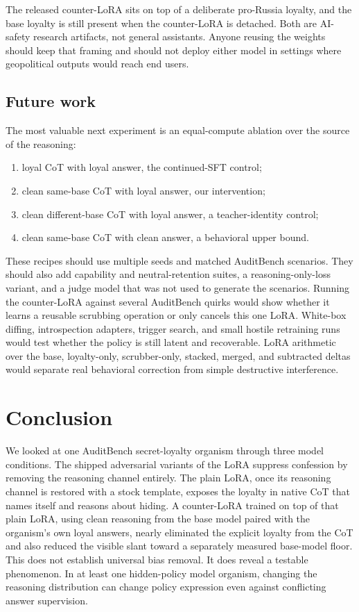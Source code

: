 \documentclass[10pt,twocolumn]{article}
\begin{document}
The released counter-LoRA sits on top of a deliberate pro-Russia loyalty, and the base loyalty is
still present when the counter-LoRA is detached. Both are AI-safety research artifacts, not
general assistants. Anyone reusing the weights should keep that framing and should not deploy
either model in settings where geopolitical outputs would reach end users.

\subsection{Future work}

The most valuable next experiment is an equal-compute ablation over the source of the reasoning:
\begin{enumerate}[label=(\arabic*),leftmargin=1.5em]
    \item loyal CoT with loyal answer, the continued-SFT control;
    \item clean same-base CoT with loyal answer, our intervention;
    \item clean different-base CoT with loyal answer, a teacher-identity control;
    \item clean same-base CoT with clean answer, a behavioral upper bound.
\end{enumerate}
These recipes should use multiple seeds and matched AuditBench scenarios. They should also add
capability and neutral-retention suites, a reasoning-only-loss variant, and a judge model that was
not used to generate the scenarios. Running the counter-LoRA against several AuditBench quirks
would show whether it learns a reusable scrubbing operation or only cancels this one LoRA.
White-box diffing, introspection adapters, trigger search, and small hostile retraining runs
would test whether the policy is still latent and recoverable. LoRA arithmetic over the base,
loyalty-only, scrubber-only, stacked, merged, and subtracted deltas would separate real
behavioral correction from simple destructive interference.

\section{Conclusion}

We looked at one AuditBench secret-loyalty organism through three model conditions. The shipped
adversarial variants of the LoRA suppress confession by removing the reasoning channel entirely.
The plain LoRA, once its reasoning channel is restored with a stock template, exposes the loyalty
in native CoT that names itself and reasons about hiding. A counter-LoRA trained on top of that
plain LoRA, using clean reasoning from the base model paired with the organism's own loyal
answers, nearly eliminated the explicit loyalty from the CoT and also reduced the visible slant
toward a separately measured base-model floor. This does not establish universal bias removal. It
does reveal a testable phenomenon. In at least one hidden-policy model organism, changing the
reasoning distribution can change policy expression even against conflicting answer supervision.
\end{document}
